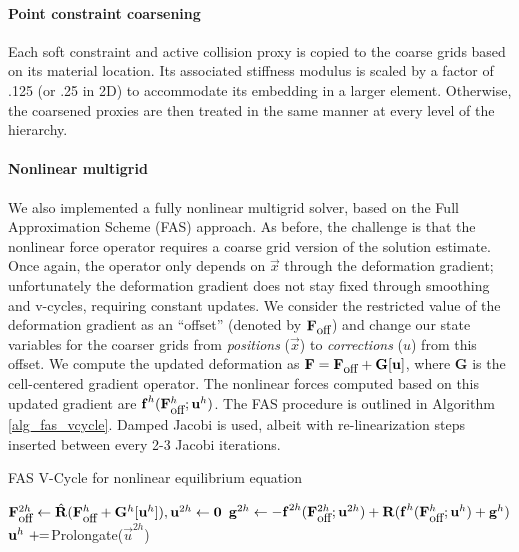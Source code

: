 \paragraph{Point constraint coarsening} Each soft constraint and active collision proxy is copied to the coarse grids based on its material location.  Its associated stiffness modulus is scaled by a factor of .125 (or .25 in 2D) to accommodate its embedding in a larger element.  Otherwise, the coarsened proxies are then treated in the same manner at every level of the hierarchy.

\paragraph{Nonlinear multigrid} We also implemented a fully nonlinear multigrid
solver, based on the Full Approximation Scheme (FAS) approach. As before, the
challenge is  that the nonlinear force operator requires a coarse grid version of the solution estimate. Once
again, the operator only depends on $\vec{x}$ through the deformation gradient;
unfortunately the deformation gradient does not stay fixed through smoothing and
v-cycles, requiring constant updates.  We consider the restricted value of the
deformation gradient as an ``offset'' (denoted by $\mathbf{F}_{\mbox{\small off}}$) and change
our state variables for the coarser grids from \emph{positions} ($\vec{x}$) to
\emph{corrections} ($u$) from this offset. We compute the updated deformation  as
$\mathbf{F}=\mathbf{F}_{\mbox{\small off}}+\mathbf{G}[\vec{u}]$, where
$\mathbf{G}$ is the cell-centered gradient operator. The nonlinear forces
computed based on this updated gradient are 
$\vec{f}^h(\mathbf{F}_{\mbox{\small off}}^h;\vec{u}^h)$. The FAS procedure is
outlined in Algorithm
\ref{alg_fas_vcycle}. Damped Jacobi is used, albeit with re-linearization steps inserted between every 2-3 Jacobi iterations.

\begin{algorithm}[h]
\caption{FAS V-Cycle  for nonlinear equilibrium equation}\label{alg_fas_vcycle}
\begin{algorithmic}[1]
\State {}
\State $\mathbf{F}_{\mbox{\small off}}^{2h}\gets\hat{\mathbf{R}}(\mathbf{F}_{\mbox{\small off}}^h+\mathbf{G}^h[\vec{u}^h]),\vec{u}^{2h}\gets\vec{0}$
\State $\vec{g}^{2h}\gets-\vec{f}^{2h}(\mathbf{F}_{\mbox{\small off}}^{2h};\vec{u}^{2h})+\mathbf{R}(\vec{f}^h(\mathbf{F}_{\mbox{\small off}}^h;\vec{u}^h)+\vec{g}^h)$
\State {}
\State $\vec{u}^{h}\plusequals $Prolongate($\vec{u}^{2h}$)
\State {}
\EndProcedure
\end{algorithmic}
\end{algorithm}

